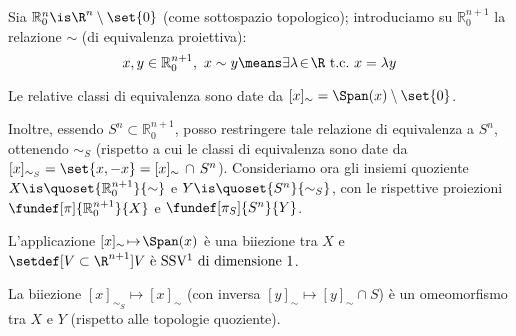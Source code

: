 

\newcommand*\Ps{\mathbb{P}} %
\newcommand*\Ro[1][n]{\mathbb{R}_0^{#1}} %
\newcommand*\tc{\ \text{t.c.} \ } %

Sia $\Ro \is \R^n \setminus \set{0}$ (come sottospazio topologico); introduciamo su $\Ro[n+1]$ la relazione $\sim $ (di equivalenza proiettiva): \[
x, y \in \Ro[n+1], \ x \sim y \means  \exists \lambda \! \in \! \R \tc x = \lambda y \]

Le relative classi di equivalenza sono date da $[x]_\sim = \Span(x) \setminus \set{0}$.

Inoltre, essendo $S^n \subset \Ro[n+1]$, posso restringere tale relazione di equivalenza a $S^n$, ottenendo $\sim_S$ (rispetto a cui le classi di equivalenza sono date da $[x]_{\sim_S} = \set{x, -x} = [x]_\sim \, \cap \, S^n$).
Consideriamo ora gli insiemi quoziente $X \is \quoset{\Ro[n+1]}{\sim}$ e $Y \is \quoset{S^n}{\sim_S}$, con le rispettive proiezioni $\fundef[\pi]{\Ro[n+1]}{X}$ e $\fundef[\pi_S]{S^n}{Y}$.

\begin{oss}
	L'applicazione $[x]_\sim \! \mapsto \! \Span(x)$ è una biiezione tra $X$ e \break
	$\setdef[V \subset \R^{n+1}]{V \text{ è SSV\footnotemark{} di dimensione 1}}$.
\end{oss}

\begin{prop}
	La biiezione $[x]_{\sim_S} \! \mapsto \! [x]_\sim$ (con inversa $[y]_\sim \! \mapsto \! [y]_\sim \cap S$) è un omeomorfismo tra $X$ e $Y$ (rispetto alle topologie quoziente).
\end{prop}
